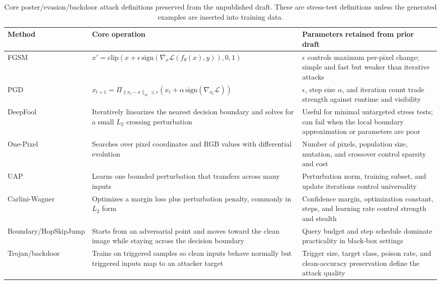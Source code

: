 \documentclass[conference]{IEEEtran}
\begin{document}
\begin{table}[t]
\centering
\caption{Core poster/evasion/backdoor attack definitions preserved from the unpublished draft. These are stress-test definitions unless the generated examples are inserted into training data.}
\label{tab:legacyattackdefs}
\small
\begin{tabular}{p{}p{}p{}}
\toprule
Method & Core operation & Parameters retained from prior draft \\
\midrule
FGSM & \(x'=\mathrm{clip}(x+\epsilon\,\mathrm{sign}(\nabla_x\mathcal{L}(f_\theta(x),y)),0,1)\) & \(\epsilon\) controls maximum per-pixel change; simple and fast but weaker than iterative attacks \\
PGD & \(x_{t+1}=\Pi_{\|x_t-x\|_\infty\le\epsilon}(x_t+\alpha\,\mathrm{sign}(\nabla_{x_t}\mathcal{L}))\) & \(\epsilon\), step size \(\alpha\), and iteration count trade strength against runtime and visibility \\
DeepFool & Iteratively linearizes the nearest decision boundary and solves for a small \(L_2\) crossing perturbation & Useful for minimal untargeted stress tests; can fail when the local boundary approximation or parameters are poor \\
One-Pixel & Searches over pixel coordinates and RGB values with differential evolution & Number of pixels, population size, mutation, and crossover control sparsity and cost \\
UAP & Learns one bounded perturbation that transfers across many inputs & Perturbation norm, training subset, and update iterations control universality \\
Carlini-Wagner & Optimizes a margin loss plus perturbation penalty, commonly in \(L_2\) form & Confidence margin, optimization constant, steps, and learning rate control strength and stealth \\
Boundary/HopSkipJump & Starts from an adversarial point and moves toward the clean image while staying across the decision boundary & Query budget and step schedule dominate practicality in black-box settings \\
Trojan/backdoor & Trains on triggered samples so clean inputs behave normally but triggered inputs map to an attacker target & Trigger size, target class, poison rate, and clean-accuracy preservation define the attack quality \\
\bottomrule
\end{tabular}
\end{table}
\end{document}
